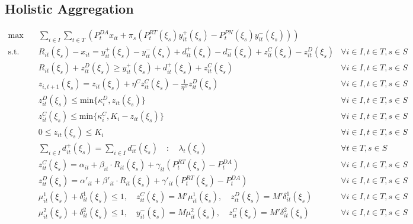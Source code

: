 \documentclass[10pt]{article}
\begin{document}
\subsection{Holistic Aggregation}
\begin{subequations}
    \begin{align}
        \text{max} \quad &\sum_{i\in I}\sum_{t\in T}\left(P_t^{DA} x_{it} + \pi_s\left(P_t^{RT}(\xi_s) y^+_{it}(\xi_s) - P_t^{PN}(\xi_s) y^-_{it}(\xi_s)\right) \right) \\   
        \text{s.t.} \quad 
        & R_{it}(\xi_s) - x_{it} = y_{it}^{+}(\xi_s) - y_{it}^{-}(\xi_s) + d^+_{it}(\xi_s) - d^-_{it}(\xi_s) + z^C_{it}(\xi_s) - z^D_{it}(\xi_s) & \forall i \in I, t \in T, s \in S \\
        & R_{it}(\xi_s) + z^D_{it}(\xi_s) \geq y^+_{it}(\xi_s) + d^+_{it}(\xi_s) + z^C_{it}(\xi_s) & \forall i \in I, t \in T, s \in S \\
        & z_{i,t+1}(\xi_s) = z_{it}(\xi_s) + \eta^C z^C_{it}(\xi_s) - \frac{1}{\eta^D} z^D_{it}(\xi_s) & \forall i \in I, t \in T, s \in S \\
        & z^D_{it}(\xi_s) \le \text{min} \{\kappa_{i}^D, z_{it}(\xi_s) \} & \forall i \in I, t \in T, s \in S \\
        & z^C_{it}(\xi_s) \le \text{min} \{\kappa_{i}^C, K_i - z_{it}(\xi_s) \} & \forall i \in I, t \in T, s \in S \\
        & 0 \leq z_{it}(\xi_s) \leq K_i & \forall i \in I, t \in T, s \in S \\
        & \sum_{i \in I} d^+_{it}(\xi_s) = \sum_{i \in I} d^-_{it}(\xi_s) \quad : \quad \lambda_t(\xi_s) & \forall t \in T, s \in S \\
        & z^C_{it}(\xi_s) = \alpha_{it} + \beta_{it} \cdot R_{it}(\xi_s) + \gamma_{it}\left(P_{t}^{RT}(\xi_s)-P_{t}^{DA}\right) & \forall i \in I, t \in T, s \in S \\
        & z^D_{it}(\xi_s) = \alpha'_{it} + \beta'_{it} \cdot R_{it}(\xi_s) + \gamma'_{it}\left(P_{t}^{RT}(\xi_s)-P_{t}^{DA}\right) & \forall i \in I, t \in T, s \in S \\
        & \mu^1_{it}(\xi_s) + \delta^{1}_{it}(\xi_s) \leq 1, \quad z^C_{it}(\xi_s) = M'\mu^1_{it}(\xi_s), \quad z^D_{it}(\xi_s) = M'\delta^{1}_{it}(\xi_s) & \forall i \in I, t \in T, s \in S \\
        & \mu^2_{it}(\xi_s) + \delta^{2}_{it}(\xi_s) \leq 1, \quad y^-_{it}(\xi_s) = M\mu^2_{it}(\xi_s), \quad z^C_{it}(\xi_s) = M'\delta^{2}_{it}(\xi_s) & \forall i \in I, t \in T, s \in S \\

\end{align}
\end{subequations}
\end{document}
